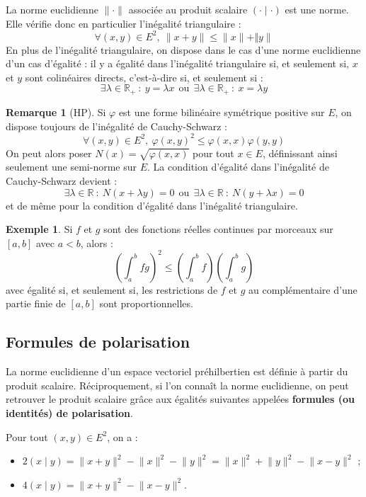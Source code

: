 \documentclass[french]{article}
\newcommand{\R}{\mathbb{R}}
\theoremstyle{plain}
\theoremstyle{definition}
\newtheorem*{ex}{Exemple}
\newtheorem*{rmq}{Remarque}
\theoremstyle{remark}
\begin{document}
\begin{prop}
	La norme euclidienne $\lVert\cdot\rVert$ associée au produit scalaire $(\cdot\mid\cdot)$ est une norme. Elle vérifie donc en particulier l'inégalité triangulaire : $$\forall (x,y)\in E^2,\ \lVert x+y\rVert\leqslant\lVert x\rVert+\Vert y\rVert$$ En plus de l'inégalité triangulaire, on dispose dans le cas d'une norme euclidienne d'un cas d'égalité : il y a égalité dans l'inégalité triangulaire si, et seulement si, $x$ et $y$ sont colinéaires directs, c'est-à-dire si, et seulement si : $$\exists\lambda\in\R_+\ : \ y=\lambda x\ \ \text{ou}\ \ \exists\lambda\in\R_+\ : \ x=\lambda y$$
\end{prop}

\begin{rmq}[HP]
	Si $\varphi$ est une forme bilinéaire symétrique positive sur $E$, on dispose toujours de l'inégalité de Cauchy-Schwarz : $$\forall (x,y)\in E^2,\ \varphi(x,y)^2\leqslant\varphi(x,x)\varphi(y,y)$$ On peut alors poser $N(x)=\sqrt{\varphi(x,x)}$ pour tout $x\in E$, définissant ainsi seulement une semi-norme sur $E$. La condition d'égalité dans l'inégalité de Cauchy-Schwarz devient : $$\exists\lambda\in\R\ : \ N(x+\lambda y)=0\ \ \text{ou}\ \ \exists\lambda\in\R\ : \ N(y+\lambda x)=0$$ et de même pour la condition d'égalité dans l'inégalité triangulaire.
\end{rmq}

\begin{ex}
	Si $f$ et $g$ sont des fonctions réelles continues par morceaux sur $[a,b]$ avec $a<b$, alors : $$\left(\int_{a}^{b}fg\right)^2\leqslant\left(\int_{a}^{b}f\right)\left(\int_{a}^{b}g\right)$$ avec égalité si, et seulement si, les restrictions de $f$ et $g$ au complémentaire d'une partie finie de $[a,b]$ sont proportionnelles.
\end{ex}

\subsection{Formules de polarisation}

La norme euclidienne d'un espace vectoriel préhilbertien est définie à partir du produit scalaire. Réciproquement, si l'on connaît la norme euclidienne, on peut retrouver le produit scalaire grâce aux égalités suivantes appelées \textbf{formules (ou identités) de polarisation}.

\begin{prop}
	Pour tout $(x,y)\in E^2$, on a :
	\begin{itemize}
		\item $2(x\mid y)=\lVert x+y\rVert^2-\lVert x\rVert^2-\lVert y\rVert^2=\lVert x\rVert^2+\lVert y\rVert^2-\lVert x-y\rVert^2$ ;
		\item $4(x\mid y)=\lVert x+y\rVert^2-\lVert x-y\rVert^2$.
	\end{itemize}
\end{prop}
\end{document}
